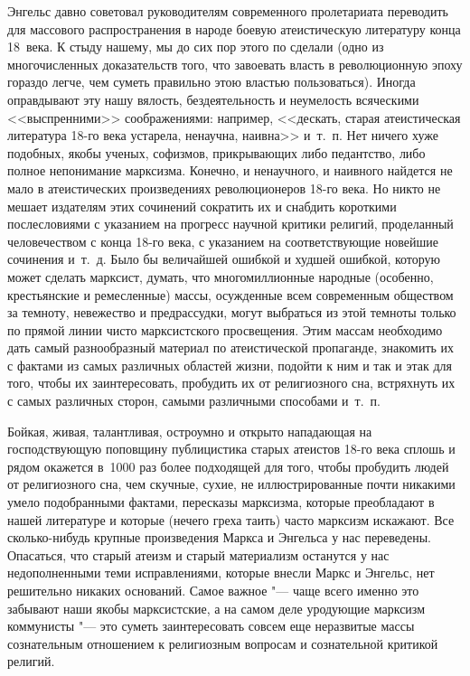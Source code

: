 Энгельс давно советовал руководителям современного пролетариата переводить
для массового распространения в народе боевую атеистическую литературу
конца 18~века. К стыду нашему, мы до сих пор этого по сделали (одно из
многочисленных доказательств того, что завоевать власть в революционную
эпоху гораздо легче, чем суметь правильно этою властью пользоваться).
Иногда оправдывают эту нашу вялость, бездеятельность и неумелость
всяческими <<выспренними>> соображениями: например, <<дескать, старая
атеистическая литература 18-го века устарела, ненаучна, наивна>> и~т.~п. Нет
ничего хуже подобных, якобы ученых, софизмов, прикрывающих либо педантство,
либо полное непонимание марксизма. Конечно, и ненаучного, и наивного
найдется не мало в атеистических произведениях революционеров 18-го века.
Но никто не мешает издателям этих сочинений сократить их и снабдить
короткими послесловиями с указанием на прогресс научной критики религий,
проделанный человечеством с конца 18-го века, с указанием на
соответствующие новейшие сочинения и~т.~д. Было бы величайшей ошибкой и
худшей ошибкой, которую может сделать марксист, думать, что многомиллионные
народные (особенно, крестьянские и ремесленные) массы, осужденные всем
современным обществом за темноту, невежество и предрассудки, могут
выбраться из этой темноты только по прямой линии чисто марксистского
просвещения. Этим массам необходимо дать самый разнообразный материал по
атеистической пропаганде, знакомить их с фактами из самых различных
областей жизни, подойти к ним и так и этак для того, чтобы их
заинтересовать, пробудить их от религиозного сна, встряхнуть их с самых
различных сторон, самыми различными способами и~т.~п.

Бойкая, живая, талантливая, остроумно и открыто нападающая на господствующую
поповщину публицистика старых атеистов 18-го века сплошь и рядом окажется
в~1000 раз более подходящей для того, чтобы пробудить людей от религиозного
сна, чем скучные, сухие, не иллюстрированные почти никакими умело
подобранными фактами, пересказы марксизма, которые преобладают в нашей
литературе и которые (нечего греха таить) часто марксизм искажают. Все
сколько-нибудь крупные произведения Маркса и Энгельса у нас переведены.
Опасаться, что старый атеизм и старый материализм останутся у нас
недополненными теми исправлениями, которые внесли Маркс и Энгельс, нет
решительно никаких оснований. Самое важное "--- чаще всего именно это забывают
наши якобы марксистские, а на самом деле уродующие марксизм коммунисты
"--- это суметь заинтересовать совсем еще неразвитые массы сознательным
отношением к религиозным вопросам и сознательной критикой религий.


